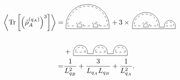 \documentclass[aps,pra,reprint,superscriptaddress,twocolumn,notitlepage]{revtex4-1}
\newcommand{\Tr}{\text{Tr}}
\numberwithin{equation}{section}
\begin{document}
\begin{align}
\label{eq:tr_r3}
     \left\langle \Tr \left[ \left( \hat\rho_{A}^{(q_A)} \right)^3 \right] \right\rangle 
    =&
    \
    \tikz[scale=0.4,baseline=0.5ex]{
    \draw[dashed] (0,0) -- (1,0);
    \draw (-0.2,0.)-- (-0.2,-0.35);
    \draw (1.2,-0.15)-- (1.2,0.);
    \draw[dashed] (2,0) -- (3,0);
    \draw (1.8,0.)-- (1.8,-0.15);
    \draw (3.2,-0.15)-- (3.2,0.);
    \draw[dashed] (4,0) -- (5,0);
    \draw (3.8,0.)-- (3.8,-0.15);
    \draw (5.2,-0.35)-- (5.2,0.);
    \draw (1.2,-0.15)--(1.8,-0.15);
    \draw (3.2,-0.15)--(3.8,-0.15);
    \draw (-0.2,-0.35)-- (5.2,-0.35);
    \draw[dashed] (4.0,0) arc (0:180:0.5);
    \draw[dashed] (2.0,0) arc (0:180:0.5);
    \draw[dashed] (5.0,0) arc (0:180:2.5);
    \draw (3.8,0) arc (0:180:0.3);
    \draw (1.8,0) arc (0:180:0.3);
    \draw (5.2,0) arc (0:180:2.7);
    }  \,
    +
    3\times\,
\tikz[scale=0.4,baseline=0.5ex]{
    \draw[dashed] (0,0) -- (1,0);
    \draw (-0.2,0.)-- (-0.2,-0.35);
    \draw (1.2,-0.15)-- (1.2,0.);
    \draw[dashed] (2,0) -- (3,0);
    \draw (1.8,0.)-- (1.8,-0.15);
    \draw (3.2,-0.15)-- (3.2,0.);
    \draw[dashed] (4,0) -- (5,0);
    \draw (3.8,0.)-- (3.8,-0.15);
    \draw (5.2,-0.35)-- (5.2,0.);
    \draw (1.2,-0.15)--(1.8,-0.15);
    \draw (3.2,-0.15)--(3.8,-0.15);
    \draw (-0.2,-0.35)-- (5.2,-0.35);
    \draw[dashed] (2.0,0) arc (0:180:0.5);
    \draw[dashed] (3.0,0) arc (0:180:1.5);
    \draw[dashed] (5.0,0) arc (0:180:0.5);
    \draw (1.8,0) arc (0:180:0.3);
    \draw (3.2,0) arc (0:180:1.7);
    \draw (5.2,0) arc (0:180:0.7);
    }  
    \nonumber \\ \nonumber \\
   & +
    \,
    \tikz[scale=0.5,baseline=-0.5ex]{
    \draw[dashed] (0,0) -- (1,0);
    \draw (-0.2,0.)-- (-0.2,-0.35);
    \draw (1.2,-0.15)-- (1.2,0.);
    \draw[dashed] (2,0) -- (3,0);
    \draw (1.8,0.)-- (1.8,-0.15);
    \draw (3.2,-0.15)-- (3.2,0.);
    \draw[dashed] (4,0) -- (5,0);
    \draw (3.8,0.)-- (3.8,-0.15);
    \draw (5.2,-0.35)-- (5.2,0.);
    \draw (1.2,-0.15)--(1.8,-0.15);
    \draw (3.2,-0.15)--(3.8,-0.15);
    \draw (-0.2,-0.35)-- (5.2,-0.35);
    \draw[dashed] (1.0,0) arc (0:180:0.5);
    \draw[dashed] (3.0,0) arc (0:180:0.5);
    \draw[dashed] (5.0,0) arc (0:180:0.5);
    \draw (1.2,0) arc (0:180:0.7);
    \draw (3.2,0) arc (0:180:0.7);
    \draw (5.2,0) arc (0:180:0.7);
    } \,
     \nonumber \\ 
    =& 
    \frac{1}{ L_{q_B}^2} 
    + \frac{3}{L_{q_A} L_{q_B}}
    + \frac{1}{L_{q_A}^2}.
\end{align}
\end{document}
